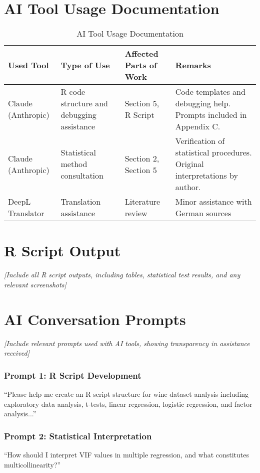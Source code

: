 \appendix

\chapter{AI Tool Usage Documentation}

\begin{table}[H]
\centering
\caption{AI Tool Usage Documentation}
\begin{tabular}{|p{3cm}|p{4cm}|p{4cm}|p{4cm}|}
\hline
\textbf{Used Tool} & \textbf{Type of Use} & \textbf{Affected Parts of Work} & \textbf{Remarks} \\
\hline
Claude (Anthropic) & R code structure and debugging assistance & Section 5, R Script & Code templates and debugging help. Prompts included in Appendix C. \\
\hline
Claude (Anthropic) & Statistical method consultation & Section 2, Section 5 & Verification of statistical procedures. Original interpretations by author. \\
\hline
DeepL Translator & Translation assistance & Literature review & Minor assistance with German sources \\
\hline
\end{tabular}
\end{table}

\chapter{R Script Output}

\textit{[Include all R script outputs, including tables, statistical test results, and any relevant screenshots]}

\chapter{AI Conversation Prompts}

\textit{[Include relevant prompts used with AI tools, showing transparency in assistance received]}

\subsection{Prompt 1: R Script Development}
``Please help me create an R script structure for wine dataset analysis including exploratory data analysis, t-tests, linear regression, logistic regression, and factor analysis...''

\subsection{Prompt 2: Statistical Interpretation}
``How should I interpret VIF values in multiple regression, and what constitutes multicollinearity?''

